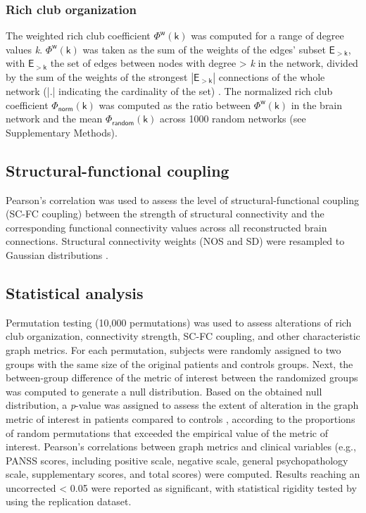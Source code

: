 \begin{refsection}
\subsubsection*{Rich club organization}
The weighted rich club coefficient $\mathsf{{\Phi}^{w}(k)}$ was computed for a range of degree values \textit{k}. $\mathsf{{\Phi}^{w}(k)}$ was taken as the sum of the weights of the edges' subset $\mathsf{E_{>k}}$, with $\mathsf{E_{>k}}$ the set of edges between nodes with degree > \textit{k} in the network, divided by the sum of the weights of the strongest $|\mathsf{E_{>k}}|$ connections of the whole network (|.| indicating the cardinality of the set) \citep{vanDenHeuvel2011RichclubOO,Opsahl2008ProminenceAC}. The normalized rich club coefficient $\mathsf{{\Phi}_{norm}(k)}$ was computed as the ratio between $\mathsf{{\Phi}^{w}(k)}$ in the brain network and the mean $\mathsf{{\Phi}_{random}(k)}$ across 1000 random networks (see Supplementary Methods).

\subsection*{Structural-functional coupling}
Pearson's correlation was used to assess the level of structural-functional coupling (SC-FC coupling) between the strength of structural connectivity and the corresponding functional connectivity values across all reconstructed brain connections. Structural connectivity weights (NOS and SD) were resampled to Gaussian distributions \citep{Hagmann2008MappingTS}.

\subsection*{Statistical analysis}
Permutation testing (10,000 permutations) was used to assess alterations of rich club organization, connectivity strength, SC-FC coupling, and other characteristic graph metrics. For each permutation, subjects were randomly assigned to two groups with the same size of the original patients and controls groups. Next, the between-group difference of the metric of interest between the randomized groups was computed to generate a null distribution. Based on the obtained null distribution, a \textit{p}-value was assigned to assess the extent of alteration in the graph metric of interest in patients compared to controls \citep{vanDenHeuvel2013AbnormalRC}, according to the proportions of random permutations that exceeded the empirical value of the metric of interest. Pearson's correlations between graph metrics and clinical variables (e.g., PANSS scores, including positive scale, negative scale, general psychopathology scale, supplementary scores, and total scores) were computed. Results reaching an uncorrected \pval < 0.05 were reported as significant, with statistical rigidity tested by using the replication dataset.


\end{refsection}
